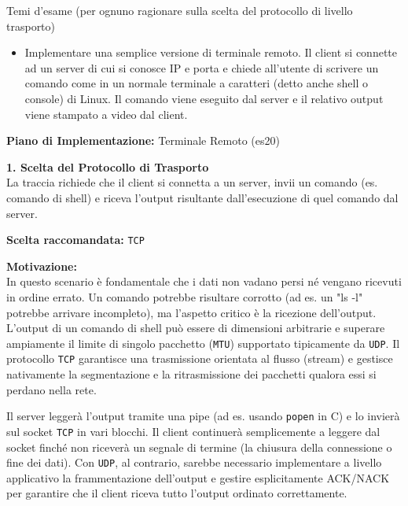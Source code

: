 \documentclass[11pt]{article}
\begin{document}
\begin{tcolorbox}[colback=blue!5!white,colframe=blue!75!black,title=\textbf{DOMANDA}, breakable]
Temi d'esame (per ognuno ragionare sulla scelta del protocollo di livello trasporto)
\begin{itemize}
    \item Implementare una semplice versione di terminale remoto. Il client si connette ad un server di cui si conosce IP e porta e chiede all'utente di scrivere un comando come in un normale terminale a caratteri (detto anche shell o console) di Linux. Il comando viene eseguito dal server e il relativo output viene stampato a video dal client.
\end{itemize}
\end{tcolorbox}

\begin{tcolorbox}[colback=green!5!white,colframe=green!75!black,title=\textbf{RISPOSTA}, breakable]
\textbf{Piano di Implementazione:} Terminale Remoto (es20)

\textbf{1. Scelta del Protocollo di Trasporto}\\
La traccia richiede che il client si connetta a un server, invii un comando (es. comando di shell) e riceva l'output risultante dall'esecuzione di quel comando dal server.

\textbf{Scelta raccomandata:} \texttt{TCP}

\textbf{Motivazione:}\\
In questo scenario è fondamentale che i dati non vadano persi né vengano ricevuti in ordine errato. Un comando potrebbe risultare corrotto (ad es. un "ls -l" potrebbe arrivare incompleto), ma l'aspetto critico è la ricezione dell'output. L'output di un comando di shell può essere di dimensioni arbitrarie e superare ampiamente il limite di singolo pacchetto (\texttt{MTU}) supportato tipicamente da \texttt{UDP}. Il protocollo \texttt{TCP} garantisce una trasmissione orientata al flusso (stream) e gestisce nativamente la segmentazione e la ritrasmissione dei pacchetti qualora essi si perdano nella rete.

Il server leggerà l'output tramite una pipe (ad es. usando \texttt{popen} in C) e lo invierà sul socket \texttt{TCP} in vari blocchi. Il client continuerà semplicemente a leggere dal socket finché non riceverà un segnale di termine (la chiusura della connessione o fine dei dati). Con \texttt{UDP}, al contrario, sarebbe necessario implementare a livello applicativo la frammentazione dell'output e gestire esplicitamente ACK/NACK per garantire che il client riceva tutto l'output ordinato correttamente.


\end{tcolorbox}
\end{document}
